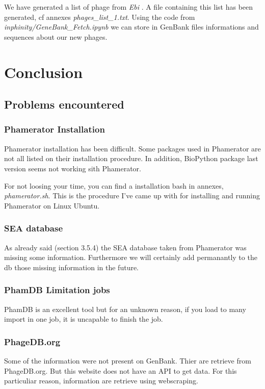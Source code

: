 \documentclass[a4paper,11pt]{report}
\begin{document}
We have generated a list of phage from \textit{Ebi} \cite{ref8}. A file containing this list has been generated, cf annexes \textit{phages\_list\_1.txt}. Using the code from \textit{inphinity/GeneBank\_Fetch.ipynb} we can store in GenBank files informations and sequences about our new phages. 

\chapter{Conclusion}

\section{Problems encountered}
\subsection{Phamerator Installation}
Phamerator installation has been difficult. Some packages used in Phamerator are not all listed on their installation procedure. In addition, BioPython package last version seems not working sith Phamerator.

For not loosing your time, you can find a installation bash in annexes, \textit{phamerator.sh}. This is the procedure I've came up with for installing and running Phamerator on Linux Ubuntu.

\subsection{SEA database}
As already said (section 3.5.4) the SEA database taken from Phamerator was missing some information. Furthermore we will certainly add permanantly to the db those missing information in the future.

\subsection{PhamDB Limitation jobs}
PhamDB is an excellent tool but for an unknown reason, if you load to many import in one job, it is uncapable to finish the job.

\subsection{PhageDB.org}
Some of the information were not present on GenBank. Thier are retrieve from PhageDB.org. But this website does not have an API to get data. For this particuliar reason, information are retrieve using webscraping.
\end{document}
